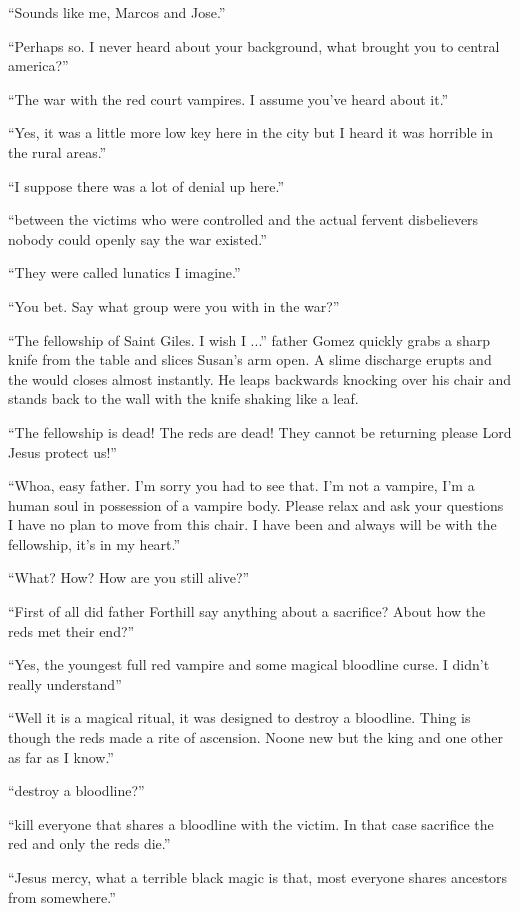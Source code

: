 ``Sounds like me, Marcos and Jose.''

``Perhaps so. I never heard about your background, what brought you to central america?''

``The war with the red court vampires. I assume you've heard about it.''

``Yes, it was a little more low key here in the city but I heard it was horrible in the rural areas.''

``I suppose there was a lot of denial up here.''

``between the victims who were controlled and the actual fervent disbelievers nobody could openly say the war existed.''

``They were called lunatics I imagine.''

``You bet. Say what group were you with in the war?''

``The fellowship of Saint Giles. I wish I ...''
father Gomez quickly grabs a sharp knife from the table and slices Susan's arm open. A slime discharge erupts and the would closes almost instantly.
He leaps backwards knocking over his chair and stands back to the wall with the knife shaking like a leaf.

``The fellowship is dead! The reds are dead! They cannot be returning please Lord Jesus protect us!''

``Whoa, easy father. I'm sorry you had to see that. I'm not a vampire, I'm a human soul in possession of a vampire body. Please relax and ask your questions I have no plan to move from this chair. I have been and always will be with the fellowship, it's in my heart.''

``What? How? How are you still alive?''

``First of all did father Forthill say anything about a sacrifice? About how the reds met their end?''

``Yes, the youngest full red vampire and some magical bloodline curse. I didn't really understand''

``Well it is a magical ritual, it was designed to destroy a bloodline. Thing is though the reds made a rite of ascension. Noone new but the king and one other as far as I know.''

``destroy a bloodline?''

``kill everyone that shares a bloodline with the victim. In that case sacrifice the red and only the reds die.''

``Jesus mercy, what a terrible black magic is that, most everyone shares ancestors from somewhere.''

